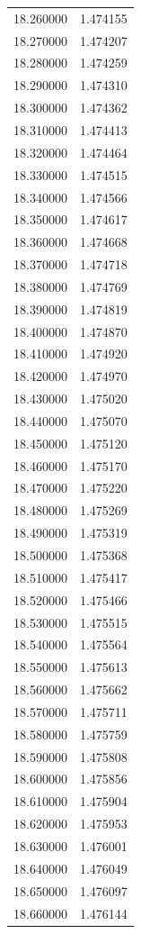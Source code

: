 \begin{tabular}{rr}
18.260000 & 1.474155 \\
18.270000 & 1.474207 \\
18.280000 & 1.474259 \\
18.290000 & 1.474310 \\
18.300000 & 1.474362 \\
18.310000 & 1.474413 \\
18.320000 & 1.474464 \\
18.330000 & 1.474515 \\
18.340000 & 1.474566 \\
18.350000 & 1.474617 \\
18.360000 & 1.474668 \\
18.370000 & 1.474718 \\
18.380000 & 1.474769 \\
18.390000 & 1.474819 \\
18.400000 & 1.474870 \\
18.410000 & 1.474920 \\
18.420000 & 1.474970 \\
18.430000 & 1.475020 \\
18.440000 & 1.475070 \\
18.450000 & 1.475120 \\
18.460000 & 1.475170 \\
18.470000 & 1.475220 \\
18.480000 & 1.475269 \\
18.490000 & 1.475319 \\
18.500000 & 1.475368 \\
18.510000 & 1.475417 \\
18.520000 & 1.475466 \\
18.530000 & 1.475515 \\
18.540000 & 1.475564 \\
18.550000 & 1.475613 \\
18.560000 & 1.475662 \\
18.570000 & 1.475711 \\
18.580000 & 1.475759 \\
18.590000 & 1.475808 \\
18.600000 & 1.475856 \\
18.610000 & 1.475904 \\
18.620000 & 1.475953 \\
18.630000 & 1.476001 \\
18.640000 & 1.476049 \\
18.650000 & 1.476097 \\
18.660000 & 1.476144 \\

\end{tabular}
